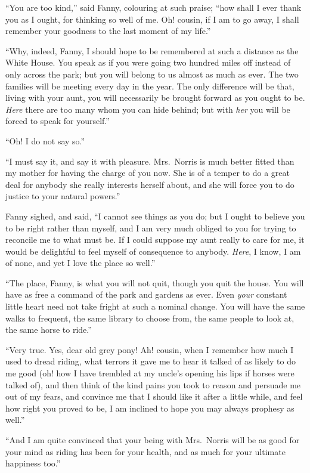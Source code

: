 ``You are too kind,'' said Fanny, colouring at such praise;
``how shall I ever thank you as I ought, for thinking
so well of me.  Oh! cousin, if I am to go away, I shall
remember your goodness to the last moment of my life.''

``Why, indeed, Fanny, I should hope to be remembered at
such a distance as the White House.  You speak as if you
were going two hundred miles off instead of only across
the park; but you will belong to us almost as much as ever.
The two families will be meeting every day in the year.
The only difference will be that, living with your aunt,
you will necessarily be brought forward as you ought to be.
\emph{Here} there are too many whom you can hide behind; but with
\emph{her} you will be forced to speak for yourself.''

``Oh!  I do not say so.''

``I must say it, and say it with pleasure.  Mrs.\ Norris
is much better fitted than my mother for having the charge
of you now.  She is of a temper to do a great deal
for anybody she really interests herself about, and she
will force you to do justice to your natural powers.''

Fanny sighed, and said, ``I cannot see things as you do;
but I ought to believe you to be right rather than myself,
and I am very much obliged to you for trying to reconcile
me to what must be.  If I could suppose my aunt really
to care for me, it would be delightful to feel myself
of consequence to anybody.  \emph{Here}, I know, I am of none,
and yet I love the place so well.''

``The place, Fanny, is what you will not quit, though you
quit the house.  You will have as free a command of the
park and gardens as ever.  Even \emph{your} constant little
heart need not take fright at such a nominal change.
You will have the same walks to frequent, the same library
to choose from, the same people to look at, the same horse
to ride.''

``Very true.  Yes, dear old grey pony!  Ah! cousin, when I
remember how much I used to dread riding, what terrors
it gave me to hear it talked of as likely to do me good
(oh! how I have trembled at my uncle's opening his lips
if horses were talked of), and then think of the kind
pains you took to reason and persuade me out of my fears,
and convince me that I should like it after a little while,
and feel how right you proved to be, I am inclined to hope
you may always prophesy as well.''

``And I am quite convinced that your being with Mrs.\ Norris
will be as good for your mind as riding has been for
your health, and as much for your ultimate happiness too.''

